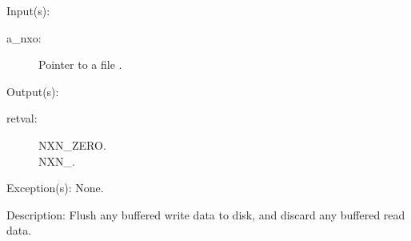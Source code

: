 \begin{capi}
\begin{capilist}
	\item[Input(s): ]
		\begin{description}\item[]
		\item[a\_nxo: ]
			Pointer to a file .
		\end{description}
	\item[Output(s): ]
		\begin{description}\item[]
		\item[retval: ]
			\begin{description}\item[]
			\item[NXN\_ZERO.]
			\item[NXN\_.]
			\end{description}
		\end{description}
	\item[Exception(s): ] None.
	\item[Description: ]
		Flush any buffered write data to disk, and discard any buffered
		read data.
	\end{capilist}
\end{capi}
